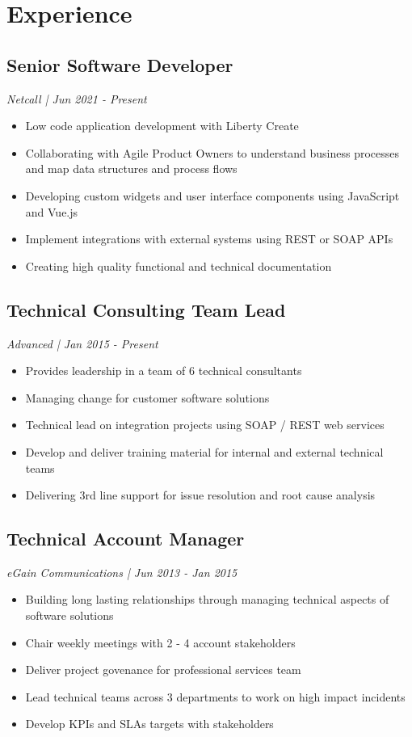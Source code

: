 %
%
\section{Experience}
%
%
\subsection{Senior Software Developer}
\textit{ Netcall | Jun 2021 - Present }
\begin{itemize}
\vspace{6pt}
	\item Low code application development with Liberty Create
	\item Collaborating with Agile Product Owners to understand business processes and map data structures and process flows
	\item Developing custom widgets and user interface components using JavaScript and Vue.js
	\item Implement integrations with external systems using REST or SOAP APIs
	\item Creating high quality functional and technical documentation
\end{itemize}

%
%
\subsection{Technical Consulting Team Lead}
\textit{ Advanced | Jan 2015 - Present }
\begin{itemize}
\vspace{6pt}
	\item Provides leadership in a team of 6 technical consultants
	\item Managing change for customer software solutions
	\item Technical lead on integration projects using SOAP / REST web services
	\item Develop and deliver training material for internal and external technical teams
	\item Delivering 3rd line support for issue resolution and root cause analysis
\end{itemize}

%
%
\subsection{Technical Account Manager}
\textit{ eGain Communications | Jun 2013 - Jan 2015 }
\begin{itemize}
	\item Building long lasting relationships through managing technical aspects of software solutions
	\item Chair weekly meetings with 2 - 4 account stakeholders
	\item Deliver project govenance for professional services team
	\item Lead technical teams across 3 departments to work on high impact incidents
	\item Develop KPIs and SLAs targets with stakeholders
\end{itemize}


